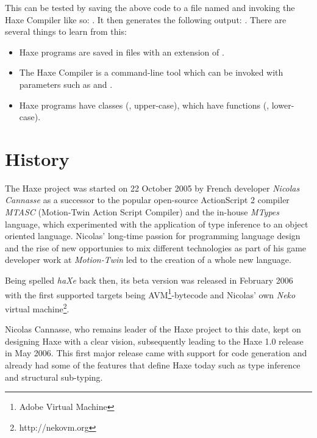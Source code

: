This can be tested by saving the above code to a file named  and invoking the Haxe Compiler like so: . It then generates the following output: . There are several things to learn from this:

\begin{itemize}
	\item Haxe programs are saved in files with an extension of .
	\item The Haxe Compiler is a command-line tool which can be invoked with parameters such as  and .
	\item Haxe programs have classes (, upper-case), which have functions (, lower-case). 
\end{itemize}

\section{History}
\label{introduction-haxe-history}

The Haxe project was started on 22 October 2005 by French developer \emph{Nicolas Cannasse} as a successor to the popular open-source ActionScript 2 compiler \emph{MTASC} (Motion-Twin Action Script Compiler) and the in-house \emph{MTypes} language, which experimented with the application of type inference to an object oriented language. Nicolas' long-time passion for programming language design and the rise of new opportunies to mix different technologies as part of his game developer work at \emph{Motion-Twin} led to the creation of a whole new language.

Being spelled \emph{haXe} back then, its beta version was released in February 2006 with the first supported targets being AVM\footnote{Adobe Virtual Machine}-bytecode and Nicolas' own \emph{Neko} virtual machine\footnote{http://nekovm.org}.

Nicolas Cannasse, who remains leader of the Haxe project to this date, kept on designing Haxe with a clear vision, subsequently leading to the Haxe 1.0 release in May 2006. This first major release came with support for  code generation and already had some of the features that define Haxe today such as type inference and structural sub-typing.

